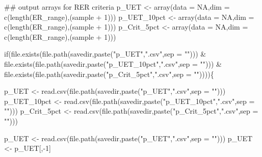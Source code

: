 \documentclass[
  11pt,
]{article}
\newenvironment{Shaded}{}{}
\newcommand{\CommentTok}[1]{\textcolor[rgb]{0.00,0.50,0.00}{#1}}
\newcommand{\ControlFlowTok}[1]{\textcolor[rgb]{0.00,0.00,1.00}{#1}}
\newcommand{\DataTypeTok}[1]{#1}
\newcommand{\DecValTok}[1]{#1}
\newcommand{\KeywordTok}[1]{\textcolor[rgb]{0.00,0.00,1.00}{#1}}
\newcommand{\NormalTok}[1]{#1}
\newcommand{\OperatorTok}[1]{#1}
\newcommand{\OtherTok}[1]{\textcolor[rgb]{1.00,0.25,0.00}{#1}}
\newcommand{\StringTok}[1]{\textcolor[rgb]{0.00,0.50,0.50}{#1}}
\begin{document}
\begin{Shaded}
\begin{Highlighting}[]
\CommentTok{## output arrays for RER criteria}
\NormalTok{p_UET <-}\StringTok{ }\KeywordTok{array}\NormalTok{(}\DataTypeTok{data =} \OtherTok{NA}\NormalTok{,}\DataTypeTok{dim =} \KeywordTok{c}\NormalTok{(}\KeywordTok{length}\NormalTok{(ER_range),(sample }\OperatorTok{+}\StringTok{ }\DecValTok{1}\NormalTok{)))}
\NormalTok{p_UET_10pct <-}\StringTok{ }\KeywordTok{array}\NormalTok{(}\DataTypeTok{data =} \OtherTok{NA}\NormalTok{,}\DataTypeTok{dim =} \KeywordTok{c}\NormalTok{(}\KeywordTok{length}\NormalTok{(ER_range),(sample }\OperatorTok{+}\StringTok{ }\DecValTok{1}\NormalTok{)))}
\NormalTok{p_Crit_5pct <-}\StringTok{ }\KeywordTok{array}\NormalTok{(}\DataTypeTok{data =} \OtherTok{NA}\NormalTok{,}\DataTypeTok{dim =} \KeywordTok{c}\NormalTok{(}\KeywordTok{length}\NormalTok{(ER_range),(sample }\OperatorTok{+}\StringTok{ }\DecValTok{1}\NormalTok{)))}



\ControlFlowTok{if}\NormalTok{(}\KeywordTok{file.exists}\NormalTok{(}\KeywordTok{file.path}\NormalTok{(savedir,}\KeywordTok{paste}\NormalTok{(}\StringTok{"p_UET"}\NormalTok{,}\StringTok{".csv"}\NormalTok{,}\DataTypeTok{sep =} \StringTok{""}\NormalTok{))) }\OperatorTok{&}
\StringTok{   }\KeywordTok{file.exists}\NormalTok{(}\KeywordTok{file.path}\NormalTok{(savedir,}\KeywordTok{paste}\NormalTok{(}\StringTok{"p_UET_10pct"}\NormalTok{,}\StringTok{".csv"}\NormalTok{,}\DataTypeTok{sep =} \StringTok{""}\NormalTok{))) }\OperatorTok{&}
\StringTok{   }\KeywordTok{file.exists}\NormalTok{(}\KeywordTok{file.path}\NormalTok{(savedir,}\KeywordTok{paste}\NormalTok{(}\StringTok{"p_Crit_5pct"}\NormalTok{,}\StringTok{".csv"}\NormalTok{,}\DataTypeTok{sep =} \StringTok{""}\NormalTok{))))\{}
  
\NormalTok{  p_UET <-}\StringTok{ }\KeywordTok{read.csv}\NormalTok{(}\KeywordTok{file.path}\NormalTok{(savedir,}\KeywordTok{paste}\NormalTok{(}\StringTok{"p_UET"}\NormalTok{,}\StringTok{".csv"}\NormalTok{,}\DataTypeTok{sep =} \StringTok{""}\NormalTok{)))}
\NormalTok{  p_UET_10pct <-}\StringTok{ }\KeywordTok{read.csv}\NormalTok{(}\KeywordTok{file.path}\NormalTok{(savedir,}\KeywordTok{paste}\NormalTok{(}\StringTok{"p_UET_10pct"}\NormalTok{,}\StringTok{".csv"}\NormalTok{,}\DataTypeTok{sep =} \StringTok{""}\NormalTok{)))}
\NormalTok{  p_Crit_5pct <-}\StringTok{ }\KeywordTok{read.csv}\NormalTok{(}\KeywordTok{file.path}\NormalTok{(savedir,}\KeywordTok{paste}\NormalTok{(}\StringTok{"p_Crit_5pct"}\NormalTok{,}\StringTok{".csv"}\NormalTok{,}\DataTypeTok{sep =} \StringTok{""}\NormalTok{)))}
  
\NormalTok{  p_UET <-}\StringTok{ }\KeywordTok{read.csv}\NormalTok{(}\KeywordTok{file.path}\NormalTok{(savedir,}\KeywordTok{paste}\NormalTok{(}\StringTok{"p_UET"}\NormalTok{,}\StringTok{".csv"}\NormalTok{,}\DataTypeTok{sep =} \StringTok{""}\NormalTok{)))}
\NormalTok{  p_UET <-}\StringTok{ }\NormalTok{p_UET[,}\OperatorTok{-}\DecValTok{1}\NormalTok{]}
  

\end{Highlighting}
\end{Shaded}
\end{document}
